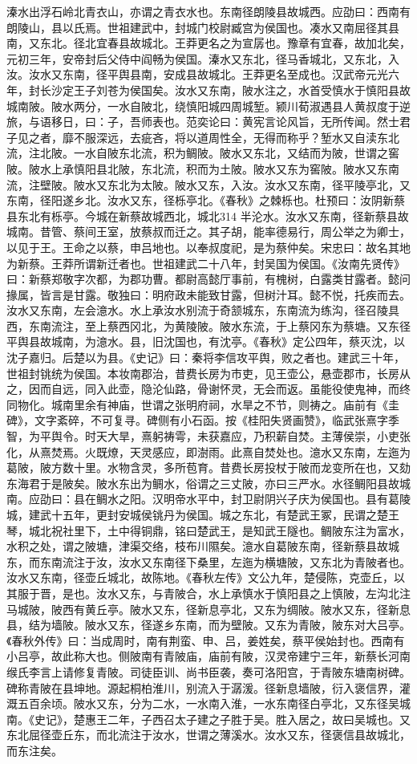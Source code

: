 \documentclass[12pt,UTF8]{ctexbook}
\begin{document}
溱水出浮石岭北青衣山，亦谓之青衣水也。东南径朗陵县故城西。应劭曰：西南有朗陵山，县以氏焉。世祖建武中，封城门校尉臧宫为侯国也。凑水又南屈径其县南，又东北。径北宜春县故城北。王莽更名之为宣孱也。豫章有宜春，故加北矣，元初三年，安帝封后父侍中阎畅为侯国。溱水又东北，径马香城北，又东北，入汝。汝水又东南，径平舆县南，安成县故城北。王莽更名至成也。汉武帝元光六年，封长沙定王子刘苍为侯国矣。汝水又东南，陂水注之，水首受慎水于慎阳县故城南陂。陂水两分，一水自陂北，绕慎阳城四周城堑。颍川荀淑遇县人黄叔度于逆旅，与语移日，曰：子，吾师表也。范奕论曰：黄宪言论风旨，无所传闻。然士君子见之者，靡不服深远，去疵吝，将以道周性全，无得而称乎？堑水又自渎东北流，注北陂。一水自陂东北流，积为鲷陂。陂水又东北，又结而为陂，世谓之窖陂。陂水上承慎阳县北陂，东北流，积而为土陂。陂水又东为窖陂。陂水又东南流，注壁陂。陂水又东北为太陂。陂水又东，入汝。汝水又东南，径平陵亭北，又东南，径阳遂乡北。汝水又东，径栎亭北。《春秋》之棘栎也。杜预曰：汝阴新蔡县东北有栎亭。今城在新蔡故城西北，城北314 半沦水。汝水又东南，径新蔡县故城南。昔管、蔡间王室，放蔡叔而迁之。其子胡，能率德易行，周公举之为卿士，以见于王。王命之以蔡，申吕地也。以奉叔度祀，是为蔡仲矣。宋忠曰：故名其地为新蔡。王莽所谓新迁者也。世祖建武二十八年，封吴国为侯国。《汝南先贤传》曰：新蔡郑敬字次都，为郡功曹。都尉高懿厅事前，有槐树，白露类甘露者。懿问掾属，皆言是甘露。敬独曰：明府政未能致甘露，但树汁耳。懿不悦，托疾而去。汝水又东南，左会澺水。水上承汝水别流于奇颔城东，东南流为练沟，径召陵具西，东南流注，至上蔡西冈北，为黄陵陂。陂水东流，于上蔡冈东为蔡塘。又东径平舆县故城南，为澺水。县，旧沈国也，有沈亭。《春秋》定公四年，蔡灭沈，以沈子嘉归。后楚以为县。《史记》曰：秦将李信攻平舆，败之者也。建武三十年，世祖封铫统为侯国。本妆南郡治，昔费长房为市吏，见王壶公，悬壶郡市，长房从之，因而自远，同入此壶，隐沦仙路，骨谢怀灵，无会而返。虽能役使鬼神，而终同物化。城南里余有神庙，世谓之张明府祠，水旱之不节，则祷之。庙前有《圭碑》，文字紊碎，不可复寻。碑侧有小石函。按《桂阳失贤画赞》，临武张熹字季智，为平舆令。时天大旱，熹躬祷雩，未获嘉应，乃积薪自焚。主薄侯崇，小吏张化，从熹焚焉。火既燎，天灵感应，即澍雨。此熹自焚处也。澺水又东南，左迤为葛陂，陂方数十里。水物含灵，多所苞育。昔费长房投杖于陂而龙变所在也，又劾东海君于是陂矣。陂水东出为鲷水，俗谓之三丈陂，亦曰三严水。水径鲷阳县故城南。应劭曰：县在鲷水之阳。汉明帝水平中，封卫尉阴兴子庆为侯国也。县有葛陵城，建武十五年，更封安城侯铫丹为侯国。城之东北，有楚武王冢，民谓之楚王琴，城北祝社里下，土中得铜鼎，铭曰楚武王，是知武王隧也。鲷陂东注为富水，水积之处，谓之陂塘，津渠交络，枝布川隰矣。澺水自葛陂东南，径新蔡县故城东，而东南流注于汝，汝水又东南径下桑里，左迤为横塘陂，又东北为青陂者也。汝水又东南，径壶丘城北，故陈地。《春秋左传》文公九年，楚侵陈，克壶丘，以其服于晋，是也。汝水又东，与青陂合，水上承慎水于慎阳县之上慎陂，左沟北注马城陂，陂西有黄丘亭。陂水又东，径新息亭北，又东为绸陂。陂水又东，径新息县，结为墙陂。陂水又东，径遂乡东南，而为壁陂。又东为青陂，陂东对大吕亭。《春秋外传》曰：当成周时，南有荆蛮、申、吕，姜姓矣，蔡平侯始封也。西南有小吕亭，故此称大也。侧陂南有青陂庙，庙前有陂，汉灵帝建宁三年，新蔡长河南缑氏李言上请修复青陂。司徒臣训、尚书臣袭，奏可洛阳宫，于青陂东塘南树碑。碑称青陂在县坤地。源起桐柏淮川，别流入于潺湲。径新息墙陂，衍入褒信界，灌溉五百余顷。陂水又东，分为二水，一水南入淮，一水东南径白亭北，又东径吴城南。《史记》，楚惠王二年，子西召太子建之子胜于吴。胜入居之，故曰吴城也。又东北屈径壶丘东，而北流注于汝水，世谓之薄溪水。汝水又东，径褒信县故城北，而东注矣。
\end{document}

